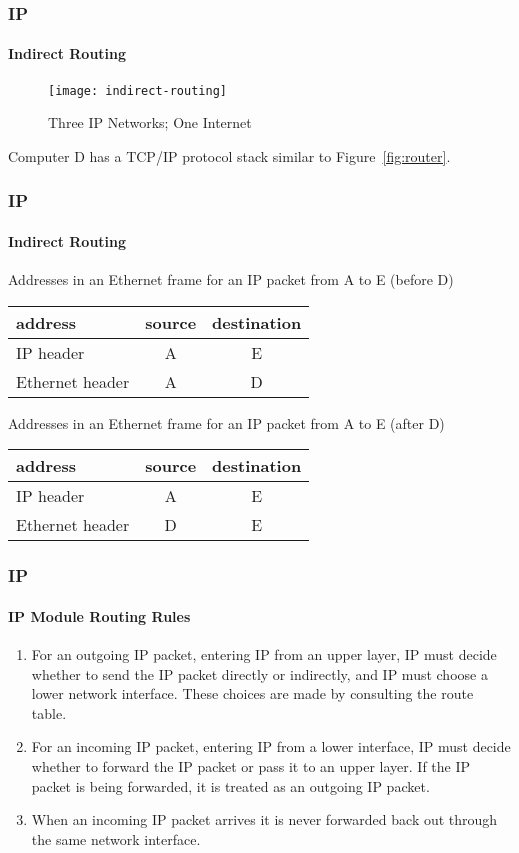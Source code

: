 \documentclass[hyperref={xetex,colorlinks,linkcolor=blue},green,compress]{beamer}
\begin{document}
  \begin{frame}
    \frametitle{IP} \framesubtitle{Indirect Routing}
    \begin{figure}
      \centering
      \texttt{[image: indirect-routing]}
      \caption{Three IP Networks; One Internet}
      \label{fig:indirect-routing}
    \end{figure}
    Computer D has a TCP/IP protocol stack similar to Figure~\ref{fig:router}.
  \end{frame}

  \begin{frame}
    \frametitle{IP} \framesubtitle{Indirect Routing}
    \begin{exampleblock}{Addresses in an Ethernet frame for an IP
        packet from A to E (before D)}
      \begin{center}
        \begin{tabular}{|lcc|}
          \hline
          address & source & destination\\\hline
          IP header & A & E \\
          Ethernet header & A & D \\\hline
        \end{tabular}
      \end{center}      
    \end{exampleblock}

    \begin{exampleblock}{Addresses in an Ethernet frame for an IP
        packet from A to E (after D)}
      \begin{center}
        \begin{tabular}{|lcc|}
          \hline
          address & source & destination\\\hline
          IP header & A & E \\
          Ethernet header & D & E \\\hline
        \end{tabular}
      \end{center}      
    \end{exampleblock}
  \end{frame}

  \begin{frame}
    \frametitle{IP} \framesubtitle{IP Module Routing Rules}
    \begin{enumerate}
    \item For an outgoing IP packet, entering IP from an upper layer,
      IP must decide whether to send the IP packet directly or
      indirectly, and IP must choose a lower network interface.  These
      choices are made by consulting the route table.
    \item For an incoming IP packet, entering IP from a lower
      interface, IP must decide whether to forward the IP packet or
      pass it to an upper layer.  If the IP packet is being forwarded,
      it is treated as an outgoing IP packet.
    \item When an incoming IP packet arrives it is never forwarded
      back out through the same network interface.
    \end{enumerate}    
  \end{frame}
\end{document}
